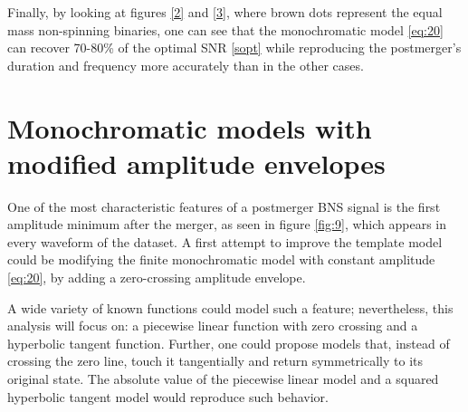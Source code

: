 \FloatBarrier

Finally, by looking at figures \ref{2} and \ref{3}, where brown dots represent the equal mass non-spinning binaries, one can see that the monochromatic model \ref{eq:20} can recover 70-80\% of the optimal SNR \ref{sopt} while reproducing the postmerger's duration and frequency more accurately than in the other cases.





\newpage
\section{Monochromatic models with modified amplitude envelopes}\label{zc-aenv}
One of the most characteristic features of a postmerger BNS signal is the first amplitude minimum after the merger, as seen in figure \ref{fig:9}, which appears in every waveform of the dataset. A first attempt to improve the template model could be modifying the finite monochromatic model with constant amplitude \ref{eq:20}, by adding a zero-crossing amplitude envelope. 

A wide variety of known functions could model such a feature; nevertheless, this analysis will focus on: a piecewise linear function with zero crossing and a hyperbolic tangent function. Further, one could propose models that, instead of crossing the zero line, touch it tangentially and return symmetrically to its original state. The absolute value of the piecewise linear model and a squared hyperbolic tangent model would reproduce such behavior.

\vspace{1cm}

